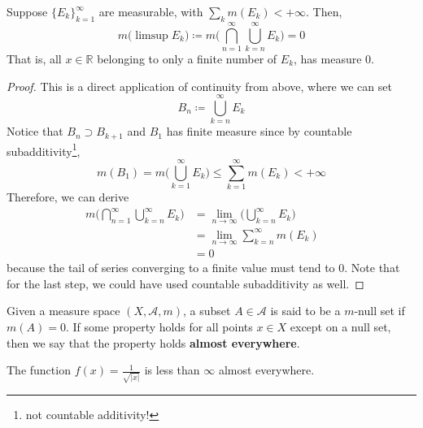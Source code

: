   \begin{lemma}
    Suppose $\{E_k\}_{k=1}^\infty$ are measurable, with $\sum_{k} m(E_k) < +\infty$. Then, 
    \begin{equation}
      m \big( \limsup E_k \big) \coloneqq m \bigg( \bigcap_{n=1}^\infty \bigcup_{k=n}^\infty E_k \bigg) = 0
    \end{equation}
    That is, all $x \in \mathbb{R}$ belonging to only a finite number of $E_k$, has measure $0$. 
  \end{lemma}
  \begin{proof} 
    This is a direct application of continuity from above, where we can set 
    \begin{equation}
      B_n \coloneqq \bigcup_{k=n}^\infty E_k 
    \end{equation}
    Notice that $B_n \supset B_{k+1}$ and $B_1$ has finite measure since by countable subadditivity\footnote{not countable additivity!}, 
    \begin{equation}
      m(B_1) = m \bigg( \bigcup_{k=1}^\infty E_k \bigg) \leq \sum_{k=1}^\infty m(E_k) < +\infty
    \end{equation}
    Therefore, we can derive 
    \begin{align}
      m \bigg( \bigcap_{n=1}^\infty \bigcup_{k=n}^\infty E_k \bigg) 
        & = \lim_{n \to \infty} \bigg( \bigcup_{k=n}^\infty E_k \bigg) && \tag{Continuity from Above} \\ 
        & = \lim_{n \to \infty} \sum_{k = n}^\infty m(E_k) && \tag{Countable Additivity} \\
        & = 0
    \end{align}
    because the tail of series converging to a finite value must tend to $0$. Note that for the last step, we could have used countable subadditivity as well. 
  \end{proof}

  \begin{definition}
    Given a measure space $(X, \mathcal{A}, m)$, a subset $A \in \mathcal{A}$ is said to be a $m$-null set if $m(A) = 0$. If some property holds for all points $x \in X$ except on a null set, then we say that the property holds \textbf{almost everywhere}.
  \end{definition}

  \begin{example}
    The function $f(x) = \frac{1}{\sqrt{|x|}}$ is less than $\infty$ almost everywhere. 
  \end{example}

